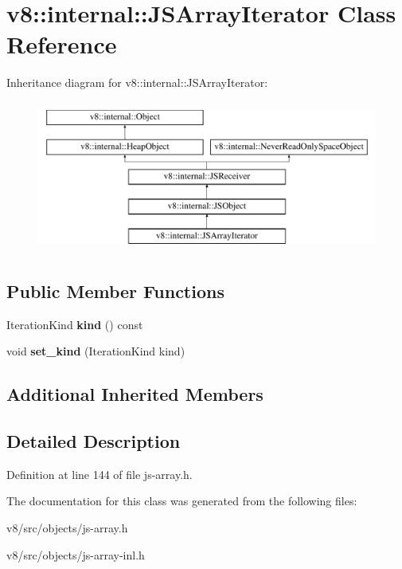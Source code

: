 \hypertarget{classv8_1_1internal_1_1JSArrayIterator}{}\section{v8\+:\+:internal\+:\+:J\+S\+Array\+Iterator Class Reference}
\label{classv8_1_1internal_1_1JSArrayIterator}
Inheritance diagram for v8\+:\+:internal\+:\+:J\+S\+Array\+Iterator\+:\begin{figure}[H]
\begin{center}
\leavevmode
\includegraphics[height=5.000000cm]{classv8_1_1internal_1_1JSArrayIterator}
\end{center}
\end{figure}
\subsection*{Public Member Functions}
\begin{DoxyCompactItemize}
\item 
\mbox{\label{classv8_1_1internal_1_1JSArrayIterator_aaea13b2e5e30b4c06b47142df8b59904}} 
Iteration\+Kind {\bfseries kind} () const
\item 
\mbox{\label{classv8_1_1internal_1_1JSArrayIterator_a4a532a7d8c5adf7131ef50d0bf118469}} 
void {\bfseries set\+\_\+kind} (Iteration\+Kind kind)
\end{DoxyCompactItemize}
\subsection*{Additional Inherited Members}


\subsection{Detailed Description}


Definition at line 144 of file js-\/array.\+h.



The documentation for this class was generated from the following files\+:\begin{DoxyCompactItemize}
\item 
v8/src/objects/js-\/array.\+h\item 
v8/src/objects/js-\/array-\/inl.\+h\end{DoxyCompactItemize}

